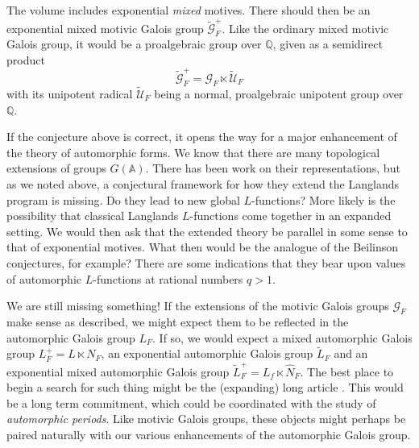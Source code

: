 \documentclass[preprint,12pt, leqno]{elsarticle}
\newcommand{\UGal}{\mathcal{G}_F}
\newcommand{\mA}{\mathbb{A}}
\newcommand{\mQ}{\mathbb{Q}}
\newcommand{\ubf}[1]{\textit{#1}}
\numberwithin{equation}{section}
\theoremstyle{named}
\begin{document}
The volume \cite{FJ} includes exponential \ubf{mixed} motives. There should then be an exponential mixed motivic Galois group $\widetilde{\mathcal{G}}_F^+$. Like the ordinary mixed motivic Galois group, it would be a proalgebraic group over $\mQ$, given as a semidirect product 
\begin{equation*}
    \widetilde{\mathcal{G}}_F^+ = \mathcal{G}_F \ltimes \widetilde{\mathcal{U}}_F
\end{equation*}
with its unipotent radical $\widetilde{\mathcal{U}}_F$ being a normal, proalgebraic unipotent group over $\mQ$.

If the conjecture above is correct, it opens the way for a major enhancement of the theory of automorphic forms. We know that there are many topological extensions of groups $G(\mA)$. There has been work on their representations, but as we noted above, a conjectural framework for how they extend the Langlands program is missing. Do they lead to new global $L$-functions? More likely is the possibility that classical Langlands $L$-functions come together in an expanded setting. We would then ask that the extended theory be parallel in some sense to that of exponential motives. What then would be the analogue of the Beilinson conjectures, for example? There are some indications that they bear upon values of automorphic $L$-functions at rational numbers $q>1$.

We are still missing something! If the extensions of the motivic Galois groups $\UGal$ make sense as described, we might expect them to be reflected in the automorphic Galois group $L_F$. If so, we would expect a mixed automorphic Galois group $L_F^+ = L \ltimes N_F$, an exponential automorphic Galois group $\widetilde{L}_F$ and an exponential mixed automorphic Galois group $\widetilde{L}_F^+ = L_f \ltimes \widehat{N}_F$. The best place to begin a search for such thing might be the (expanding) long article \cite{BSV}. This would be a long term commitment, which could be coordinated with the study of \ubf{automorphic periods}. Like motivic Galois groups, these objects might perhaps be paired naturally with our various enhancements of the automorphic Galois group.
\end{document}
